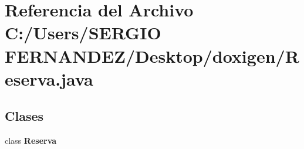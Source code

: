 \section{Referencia del Archivo C:/Users/SERGIO FERNANDEZ/Desktop/doxigen/Reserva.java}
\label{_reserva_8java}
\subsection*{Clases}
\begin{CompactItemize}
\item 
class {\bf Reserva}
\end{CompactItemize}
